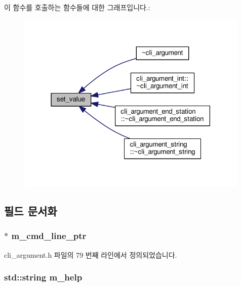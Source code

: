 이 함수를 호출하는 함수들에 대한 그래프입니다.\+:
\nopagebreak
\begin{figure}[H]
\begin{center}
\leavevmode
\includegraphics[width=315pt]{classcli__argument_a3fca6420b74bdd67ab37a11d86868800_icgraph}
\end{center}
\end{figure}




\subsection{필드 문서화}
\subsubsection[{\texorpdfstring{m\+\_\+cmd\+\_\+line\+\_\+ptr}{m_cmd_line_ptr}}]{$\ast$ m\+\_\+cmd\+\_\+line\+\_\+ptr\hspace{0.3cm}{\ttfamily [protected]}}\hypertarget{classcli__argument_a802ef904236d4228f1b8edb3a96eb9cd}{}\label{classcli__argument_a802ef904236d4228f1b8edb3a96eb9cd}


cli\+\_\+argument.\+h 파일의 79 번째 라인에서 정의되었습니다.

\subsubsection[{\texorpdfstring{m\+\_\+help}{m_help}}]{\setlength{\rightskip}{0pt plus 5cm}std\+::string m\+\_\+help\hspace{0.3cm}{\ttfamily [protected]}}\hypertarget{classcli__argument_a3985971d45415a337f60ed183b445c96}{}\label{classcli__argument_a3985971d45415a337f60ed183b445c96}


